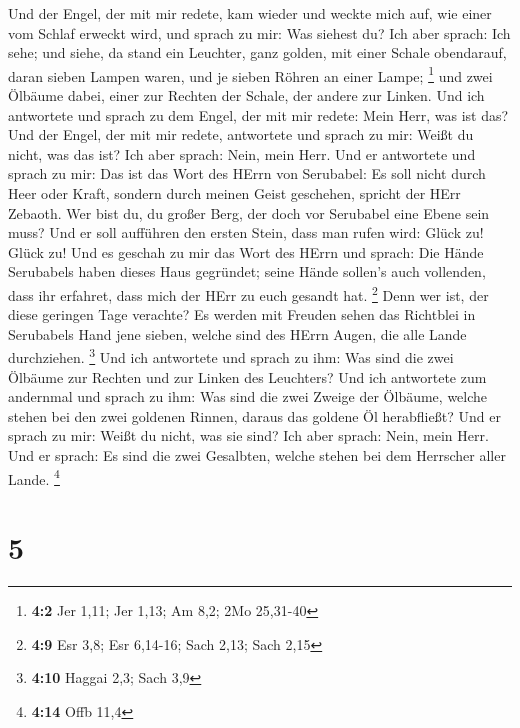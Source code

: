  Und der Engel, der mit mir redete, kam wieder und weckte
mich auf, wie einer vom Schlaf erweckt wird,  und sprach zu
mir: Was siehest du? Ich aber sprach: Ich sehe; und siehe, da stand ein
Leuchter, ganz golden, mit einer Schale obendarauf, daran sieben Lampen
waren, und je sieben Röhren an einer Lampe; \footnote{\textbf{4:2} Jer
  1,11; Jer 1,13; Am 8,2; 2Mo 25,31-40}  und zwei Ölbäume
dabei, einer zur Rechten der Schale, der andere zur Linken. 
Und ich antwortete und sprach zu dem Engel, der mit mir redete: Mein
Herr, was ist das?  Und der Engel, der mit mir redete,
antwortete und sprach zu mir: Weißt du nicht, was das ist? Ich aber
sprach: Nein, mein Herr.  Und er antwortete und sprach zu
mir: Das ist das Wort des HErrn von Serubabel: Es soll nicht durch Heer
oder Kraft, sondern durch meinen Geist geschehen, spricht der HErr
Zebaoth.  Wer bist du, du großer Berg, der doch vor
Serubabel eine Ebene sein muss? Und er soll aufführen den ersten Stein,
dass man rufen wird: Glück zu! Glück zu!  Und es geschah zu
mir das Wort des HErrn und sprach:  Die Hände Serubabels
haben dieses Haus gegründet; seine Hände sollen's auch vollenden, dass
ihr erfahret, dass mich der HErr zu euch gesandt hat. \footnote{\textbf{4:9}
  Esr 3,8; Esr 6,14-16; Sach 2,13; Sach 2,15}  Denn wer
ist, der diese geringen Tage verachte? Es werden mit Freuden sehen das
Richtblei in Serubabels Hand jene sieben, welche sind des HErrn Augen,
die alle Lande durchziehen. \footnote{\textbf{4:10} Haggai 2,3; Sach 3,9}
 Und ich antwortete und sprach zu ihm: Was sind die zwei
Ölbäume zur Rechten und zur Linken des Leuchters?  Und ich
antwortete zum andernmal und sprach zu ihm: Was sind die zwei Zweige der
Ölbäume, welche stehen bei den zwei goldenen Rinnen, daraus das goldene
Öl herabfließt?  Und er sprach zu mir: Weißt du nicht, was
sie sind? Ich aber sprach: Nein, mein Herr.  Und er sprach:
Es sind die zwei Gesalbten, welche stehen bei dem Herrscher aller Lande.
\footnote{\textbf{4:14} Offb 11,4}

\hypertarget{section-4}{%
\section{5}\label{section-4}}

